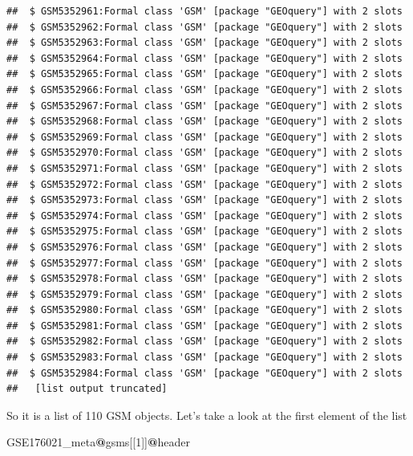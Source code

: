 \documentclass[
]{book}
\newenvironment{Shaded}{\begin{snugshade}}{\end{snugshade}}
\newcommand{\DecValTok}[1]{\textcolor[rgb]{0.00,0.00,0.81}{#1}}
\newcommand{\NormalTok}[1]{#1}
\newcommand{\SpecialCharTok}[1]{\textcolor[rgb]{0.81,0.36,0.00}{\textbf{#1}}}
\begin{document}
\begin{verbatim}
##  $ GSM5352961:Formal class 'GSM' [package "GEOquery"] with 2 slots
##  $ GSM5352962:Formal class 'GSM' [package "GEOquery"] with 2 slots
##  $ GSM5352963:Formal class 'GSM' [package "GEOquery"] with 2 slots
##  $ GSM5352964:Formal class 'GSM' [package "GEOquery"] with 2 slots
##  $ GSM5352965:Formal class 'GSM' [package "GEOquery"] with 2 slots
##  $ GSM5352966:Formal class 'GSM' [package "GEOquery"] with 2 slots
##  $ GSM5352967:Formal class 'GSM' [package "GEOquery"] with 2 slots
##  $ GSM5352968:Formal class 'GSM' [package "GEOquery"] with 2 slots
##  $ GSM5352969:Formal class 'GSM' [package "GEOquery"] with 2 slots
##  $ GSM5352970:Formal class 'GSM' [package "GEOquery"] with 2 slots
##  $ GSM5352971:Formal class 'GSM' [package "GEOquery"] with 2 slots
##  $ GSM5352972:Formal class 'GSM' [package "GEOquery"] with 2 slots
##  $ GSM5352973:Formal class 'GSM' [package "GEOquery"] with 2 slots
##  $ GSM5352974:Formal class 'GSM' [package "GEOquery"] with 2 slots
##  $ GSM5352975:Formal class 'GSM' [package "GEOquery"] with 2 slots
##  $ GSM5352976:Formal class 'GSM' [package "GEOquery"] with 2 slots
##  $ GSM5352977:Formal class 'GSM' [package "GEOquery"] with 2 slots
##  $ GSM5352978:Formal class 'GSM' [package "GEOquery"] with 2 slots
##  $ GSM5352979:Formal class 'GSM' [package "GEOquery"] with 2 slots
##  $ GSM5352980:Formal class 'GSM' [package "GEOquery"] with 2 slots
##  $ GSM5352981:Formal class 'GSM' [package "GEOquery"] with 2 slots
##  $ GSM5352982:Formal class 'GSM' [package "GEOquery"] with 2 slots
##  $ GSM5352983:Formal class 'GSM' [package "GEOquery"] with 2 slots
##  $ GSM5352984:Formal class 'GSM' [package "GEOquery"] with 2 slots
##   [list output truncated]
\end{verbatim}

So it is a list of 110 GSM objects. Let's take a look at the first element of the list

\begin{Shaded}
\begin{Highlighting}[]
\NormalTok{GSE176021\_meta}\SpecialCharTok{@}\NormalTok{gsms[[}\DecValTok{1}\NormalTok{]]}\SpecialCharTok{@}\NormalTok{header }
\end{Highlighting}
\end{Shaded}
\end{document}
